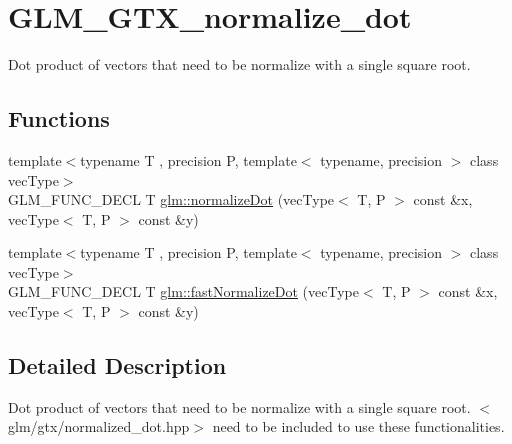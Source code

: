 \hypertarget{group__gtx__normalize__dot}{\section{G\-L\-M\-\_\-\-G\-T\-X\-\_\-normalize\-\_\-dot}
\label{group__gtx__normalize__dot}
}


Dot product of vectors that need to be normalize with a single square root.  


\subsection*{Functions}
\begin{DoxyCompactItemize}
\item 
{\footnotesize template$<$typename T , precision P, template$<$ typename, precision $>$ class vec\-Type$>$ }\\G\-L\-M\-\_\-\-F\-U\-N\-C\-\_\-\-D\-E\-C\-L T \hyperlink{group__gtx__normalize__dot_gaffbc2f2cb15838de8886a68048f9004d}{glm\-::normalize\-Dot} (vec\-Type$<$ T, P $>$ const \&x, vec\-Type$<$ T, P $>$ const \&y)
\item 
{\footnotesize template$<$typename T , precision P, template$<$ typename, precision $>$ class vec\-Type$>$ }\\G\-L\-M\-\_\-\-F\-U\-N\-C\-\_\-\-D\-E\-C\-L T \hyperlink{group__gtx__normalize__dot_ga8593b21bc2fe22184f01d5e08b5a2024}{glm\-::fast\-Normalize\-Dot} (vec\-Type$<$ T, P $>$ const \&x, vec\-Type$<$ T, P $>$ const \&y)
\end{DoxyCompactItemize}


\subsection{Detailed Description}
Dot product of vectors that need to be normalize with a single square root. $<$glm/gtx/normalized\-\_\-dot.\-hpp$>$ need to be included to use these functionalities. 

